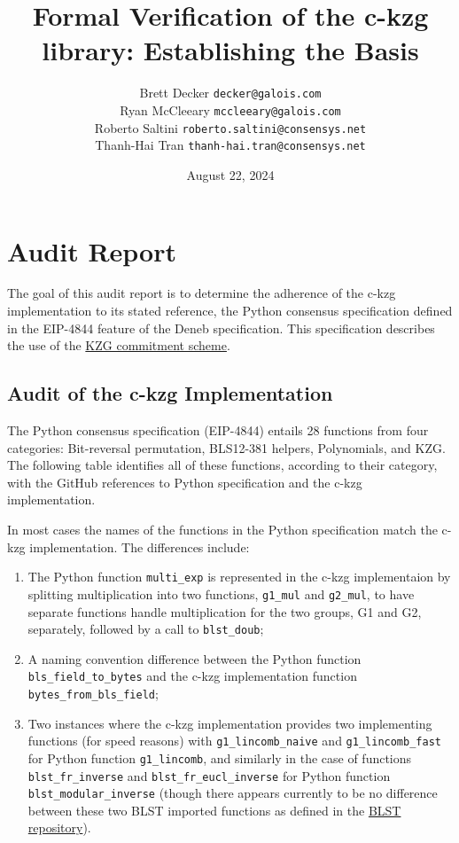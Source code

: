 \documentclass[12pt]{galois-whitepaper}
\author{Brett Decker \texttt{decker@galois.com}\\
Ryan McCleeary \texttt{mccleeary@galois.com}\\
Roberto Saltini \texttt{roberto.saltini@consensys.net}\\
Thanh-Hai Tran \texttt{thanh-hai.tran@consensys.net}
}
\title{Formal Verification of the c-kzg library: Establishing the Basis}
\date{August 22, 2024}
\begin{document}
\maketitle

\vspace*{2cm}

\newpage
\tableofcontents
\newpage

\section{Audit Report}
The goal of this audit report is to determine the adherence of the c-kzg implementation to its stated reference,
the Python consensus specification defined in the EIP-4844 feature of the Deneb specification.
This specification describes the use of the \href{https://www.iacr.org/archive/asiacrypt2010/6477178/6477178.pdf}{KZG commitment scheme}.

\subsection{Audit of the c-kzg Implementation}

The Python consensus specification (EIP-4844) entails 28 functions from four categories: 
Bit-reversal permutation, BLS12-381 helpers, Polynomials, and KZG. 
The following table identifies all of these functions, according to their category, 
with the GitHub references to Python specification and the c-kzg implementation. 

In most cases the names of the functions in the Python specification match the c-kzg implementation. 
The differences include:
\begin{enumerate}
    \item The Python function \texttt{multi\_exp} is represented in the c-kzg implementaion 
by splitting multiplication into two functions, \texttt{g1\_mul} and \texttt{g2\_mul}, to have separate functions 
handle multiplication for the two groups, G1 and G2, separately, followed by a call to \texttt{blst\_doub};
    \item A naming convention difference between the Python function \texttt{bls\_field\_to\_bytes} and the c-kzg 
implementation function \texttt{bytes\_from\_bls\_field};
    \item Two instances where the c-kzg implementation provides two implementing functions (for speed reasons) with 
\texttt{g1\_lincomb\_naive} and \texttt{g1\_lincomb\_fast} for Python function \texttt{g1\_lincomb}, and 
similarly in the case of functions \texttt{blst\_fr\_inverse} and \texttt{blst\_fr\_eucl\_inverse} for Python function 
\texttt{blst\_modular\_inverse} (though there appears currently to be no difference between these two BLST imported 
functions as defined in the 
\href{https://github.com/supranational/blst/blob/415d4f0e2347a794091836a3065206edfd9c72f3/src/recip.c#L135}{BLST repository}). 
\end{enumerate}
\end{document}
